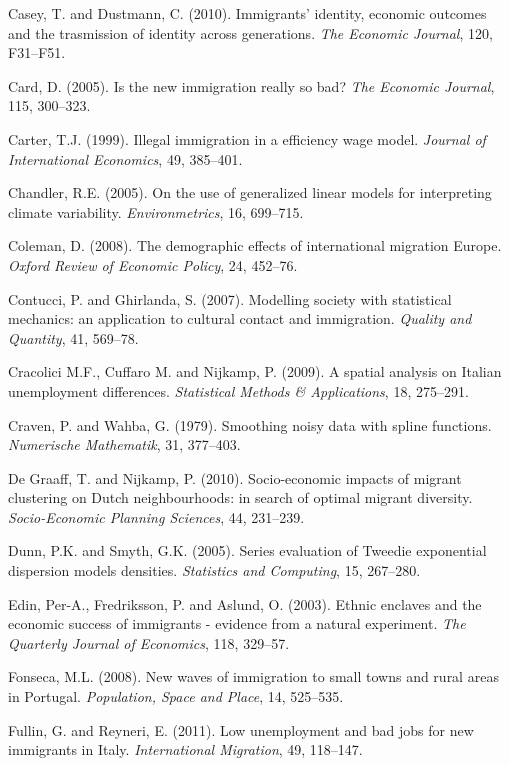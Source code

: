 \documentclass[12pt]{article}
\theoremstyle{definition}
\theoremstyle{plain}
\begin{document}
\begin{thebibliography}{99}
\bibitem{} Casey, T. and Dustmann, C. (2010). Immigrants' identity, economic outcomes and the trasmission of identity across generations. \textit{The Economic Journal}, 120, F31--F51.

\bibitem{} Card, D. (2005). Is the new immigration really so bad? \textit{The Economic Journal}, 115, 300--323.

\bibitem{} Carter, T.J. (1999). Illegal immigration in a efficiency wage model. \textit{Journal of International Economics}, 49, 385--401.

\bibitem{} Chandler, R.E. (2005). On the use of generalized linear models for interpreting climate variability. \textit{Environmetrics}, 16, 699--715.

\bibitem{} Coleman, D. (2008). The demographic effects of international migration Europe. \textit{Oxford Review of Economic Policy}, 24, 452--76.

\bibitem{} Contucci, P. and Ghirlanda, S. (2007). Modelling society with statistical mechanics: an application to cultural contact and immigration. \textit{Quality and Quantity}, 41, 569--78.

\bibitem{} Cracolici M.F., Cuffaro M. and Nijkamp, P. (2009). A spatial analysis on Italian unemployment differences. \textit{Statistical Methods \& Applications}, 18, 275--291.

\bibitem{} Craven, P. and Wahba, G. (1979). Smoothing noisy data with spline functions. \textit{Numerische Mathematik}, 31, 377--403.

\bibitem{} De Graaff, T. and Nijkamp, P. (2010). Socio-economic impacts of migrant clustering on Dutch neighbourhoods: in search of optimal migrant diversity. \textit{Socio-Economic Planning Sciences}, 44, 231--239.

\bibitem{} Dunn, P.K. and Smyth, G.K. (2005). Series evaluation of Tweedie exponential dispersion models densities. \textit{Statistics and Computing}, 15, 267--280.

\bibitem{} Edin, Per-A., Fredriksson, P. and Aslund, O. (2003). Ethnic enclaves and the economic success of immigrants - evidence from a natural experiment. \textit{The Quarterly Journal of Economics}, 118, 329--57.

\bibitem{} Fonseca, M.L. (2008). New waves of immigration to small towns and rural areas in Portugal. \textit{Population, Space and Place}, 14, 525--535.

\bibitem{} Fullin, G. and Reyneri, E. (2011). Low unemployment and bad jobs for new immigrants in Italy. \textit{International Migration}, 49, 118--147.


\end{thebibliography}
\end{document}
